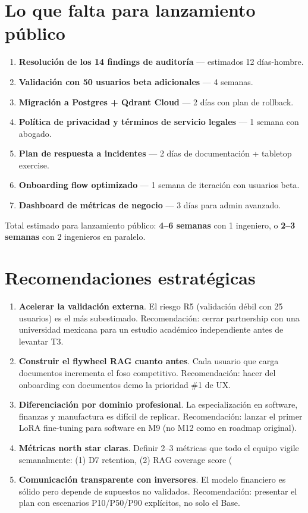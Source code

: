\documentclass[10pt,a4paper,oneside]{report}
\begin{document}
\section{Lo que falta para lanzamiento público}
\begin{enumerate}[leftmargin=1.6em]
\item \textbf{Resolución de los 14 findings de auditoría} — estimados 12 días-hombre.
\item \textbf{Validación con 50 usuarios beta adicionales} — 4 semanas.
\item \textbf{Migración a Postgres + Qdrant Cloud} — 2 días con plan de rollback.
\item \textbf{Política de privacidad y términos de servicio legales} — 1 semana con abogado.
\item \textbf{Plan de respuesta a incidentes} — 2 días de documentación + tabletop exercise.
\item \textbf{Onboarding flow optimizado} — 1 semana de iteración con usuarios beta.
\item \textbf{Dashboard de métricas de negocio} — 3 días para admin avanzado.
\end{enumerate}

Total estimado para lanzamiento público: \textbf{4--6 semanas} con 1 ingeniero, o \textbf{2--3 semanas} con 2 ingenieros en paralelo.

\section{Recomendaciones estratégicas}
\begin{enumerate}[leftmargin=1.6em]
\item \textbf{Acelerar la validación externa}. El riesgo R5 (validación débil con 25 usuarios) es el más subestimado. Recomendación: cerrar partnership con una universidad mexicana para un estudio académico independiente antes de levantar T3.
\item \textbf{Construir el flywheel RAG cuanto antes}. Cada usuario que carga documentos incrementa el foso competitivo. Recomendación: hacer del onboarding con documentos demo la prioridad \#1 de UX.
\item \textbf{Diferenciación por dominio profesional}. La especialización en software, finanzas y manufactura es difícil de replicar. Recomendación: lanzar el primer LoRA fine-tuning para software en M9 (no M12 como en roadmap original).
\item \textbf{Métricas north star claras}. Definir 2--3 métricas que todo el equipo vigile semanalmente: (1) D7 retention, (2) RAG coverage score (%
\item \textbf{Comunicación transparente con inversores}. El modelo financiero es sólido pero depende de supuestos no validados. Recomendación: presentar el plan con escenarios P10/P50/P90 explícitos, no solo el Base.
\end{enumerate}
\end{document}
